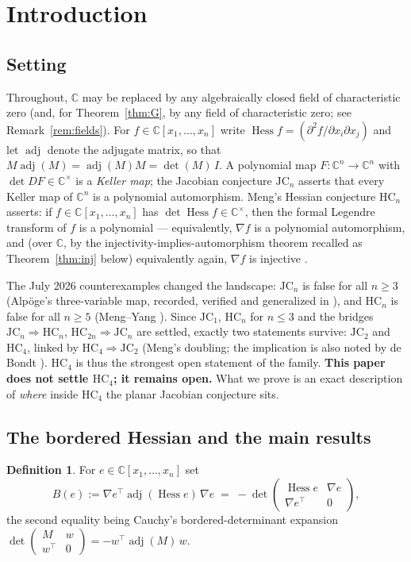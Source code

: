 \documentclass[11pt]{article}
\theoremstyle{plain}
\theoremstyle{definition}
\newtheorem{definition}[theorem]{Definition}
\newcommand{\C}{\mathbb{C}}
\newcommand{\Hess}{\operatorname{Hess}}
\newcommand{\adj}{\operatorname{adj}}
\newcommand{\HC}{\mathrm{HC}}
\newcommand{\JC}{\mathrm{JC}}
\begin{document}
\section{Introduction}\label{sec:intro}

\subsection{Setting}

Throughout, $\C$ may be replaced by any algebraically closed field of
characteristic zero (and, for Theorem~\ref{thm:G}, by any field of
characteristic zero; see Remark~\ref{rem:fields}). For
$f\in\C[x_1,\dots,x_n]$ write $\Hess f=(\partial^2f/\partial x_i\partial
x_j)$ and let $\adj$ denote the adjugate matrix, so that
$M\adj(M)=\adj(M)M=\det(M)\,I$. A polynomial map $F:\C^n\to\C^n$ with
$\det DF\in\C^{\times}$ is a \emph{Keller map}; the Jacobian conjecture
$\JC_n$ \cite{Keller,BCW} asserts that every Keller map of $\C^n$ is a
polynomial automorphism. Meng's Hessian conjecture $\HC_n$ \cite{Meng2006}
asserts: if $f\in\C[x_1,\dots,x_n]$ has $\det\Hess f\in\C^{\times}$, then
the formal Legendre transform of $f$ is a polynomial --- equivalently,
$\nabla f$ is a polynomial automorphism, and (over $\C$, by the
injectivity-implies-automorphism theorem recalled as
Theorem~\ref{thm:inj} below) equivalently again, $\nabla f$ is injective
\cite{Meng2006,MengYang}.

The July 2026 counterexamples changed the landscape: $\JC_n$ is false for
all $n\ge3$ (Alp\"oge's three-variable map, recorded, verified and
generalized in \cite{MengYang,Gao}), and $\HC_n$ is false for all $n\ge5$
(Meng--Yang \cite{MengYang}). Since $\JC_1$, $\HC_n$ for $n\le3$
\cite{Dillen,deBondt2015} and the bridges $\JC_n\Rightarrow\HC_n$,
$\HC_{2n}\Rightarrow\JC_n$ \cite{Meng2006,MengYang} are settled, exactly
two statements survive: $\JC_2$ and $\HC_4$, linked by
$\HC_4\Rightarrow\JC_2$ (Meng's doubling; the implication is also noted by
de Bondt \cite{deBondt2015}). $\HC_4$ is thus the strongest open statement
of the family. \textbf{This paper does not settle $\HC_4$; it remains
open.} What we prove is an exact description of \emph{where} inside
$\HC_4$ the planar Jacobian conjecture sits.

\subsection{The bordered Hessian and the main results}

\begin{definition}\label{def:B}
For $e\in\C[x_1,\dots,x_n]$ set
\[
B(e):=\nabla e^{\top}\adj(\Hess e)\,\nabla e
\;=\;-\det\begin{pmatrix}\Hess e&\nabla e\\ \nabla e^{\top}&0\end{pmatrix},
\]
the second equality being Cauchy's bordered-determinant expansion
$\det\left(\begin{smallmatrix}M&w\\ w^{\top}&0\end{smallmatrix}\right)
=-w^{\top}\adj(M)\,w$.
\end{definition}
\end{document}
